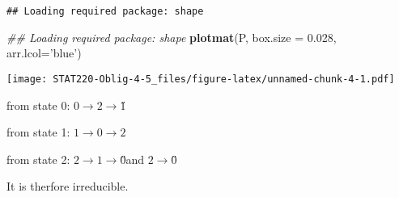 \documentclass[]{article}
\newenvironment{Shaded}{\begin{snugshade}}{\end{snugshade}}
\newcommand{\CommentTok}[1]{\textcolor[rgb]{0.56,0.35,0.01}{\textit{#1}}}
\newcommand{\DataTypeTok}[1]{\textcolor[rgb]{0.13,0.29,0.53}{#1}}
\newcommand{\FloatTok}[1]{\textcolor[rgb]{0.00,0.00,0.81}{#1}}
\newcommand{\KeywordTok}[1]{\textcolor[rgb]{0.13,0.29,0.53}{\textbf{#1}}}
\newcommand{\NormalTok}[1]{#1}
\newcommand{\StringTok}[1]{\textcolor[rgb]{0.31,0.60,0.02}{#1}}
\begin{document}
\begin{verbatim}
## Loading required package: shape
\end{verbatim}

\begin{Shaded}
\begin{Highlighting}[]
\CommentTok{## Loading required package: shape}
\KeywordTok{plotmat}\NormalTok{(P, }\DataTypeTok{box.size =} \FloatTok{0.028}\NormalTok{, }\DataTypeTok{arr.lcol=}\StringTok{'blue'}\NormalTok{)}
\end{Highlighting}
\end{Shaded}

\texttt{[image: STAT220-Oblig-4-5\_files/figure-latex/unnamed-chunk-4-1.pdf]}

from state 0: \(0 \rightarrow{2} \rightarrow{1}̋\)

from state 1: \(1 \rightarrow{0} \rightarrow{2}\)

from state 2: \(2 \rightarrow{1} \rightarrow{0}\)̋and
\(2 \rightarrow{0}̋\)

It is therfore irreducible.
\end{document}
